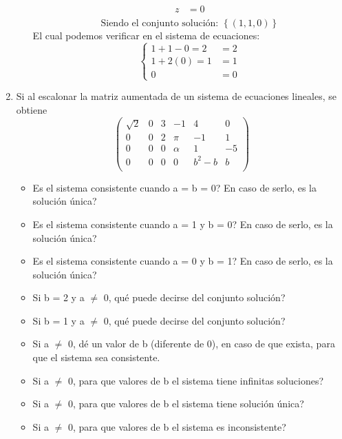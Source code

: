 \documentclass{article}
\begin{document}
\begin{enumerate}
\begin{enumerate}[label=\listAlph]
\[\begin{aligned}
                        z &= 0 \\
                    \end{aligned}
                \]
                \[
                    \text{Siendo el conjunto solución: }
                    \left\{\left(1, 1, 0\right)\right\}
                \]
                El cual podemos verificar en el sistema de ecuaciones:
                \[
                    \left\{
                        \begin{aligned}
                            1 + 1 - 0 = 2 &= 2 \\
                            1 + 2\left(0\right) = 1 &= 1 \\
                            0 &= 0
                        \end{aligned}
                    \right.
                \]
        \end{enumerate}

    \item Si al escalonar la matriz aumentada de un sistema de ecuaciones lineales, se obtiene
        \[
            \left(
            \begin{array}{ccccc|c}
                \sqrt{2}    & 0        & 3        & -1       & 4        & 0 \\
                0           & 0        & 2        & \pi      & -1       & 1 \\
                0           & 0        & 0        & \alpha   & 1        & -5 \\
                0           & 0        & 0        & 0        & b^2 - b  & b \\
            \end{array}
            \right)
        \]
        \begin{itemize}
            \item Es el sistema consistente cuando a = b = 0? En caso de serlo, es la solución única?
            \item Es el sistema consistente cuando a = 1 y b = 0? En caso de serlo, es la solución única?
            \item Es el sistema consistente cuando a = 0 y b = 1? En caso de serlo, es la solución única?
            \item Si b = 2 y a \(\neq\) 0, qué puede decirse del conjunto solución?
            \item Si b = 1 y a \(\neq\) 0, qué puede decirse del conjunto solución?
            \item Si a \(\neq\) 0, dé un valor de b (diferente de 0), en caso de que exista, para que el sistema sea consistente.
            \item Si a \(\neq\) 0, para que valores de b el sistema tiene infinitas soluciones?
            \item Si a \(\neq\) 0, para que valores de b el sistema tiene solución única?
            \item Si a \(\neq\) 0, para que valores de b el sistema es inconsistente?
        \end{itemize}


\end{enumerate}
\end{document}
